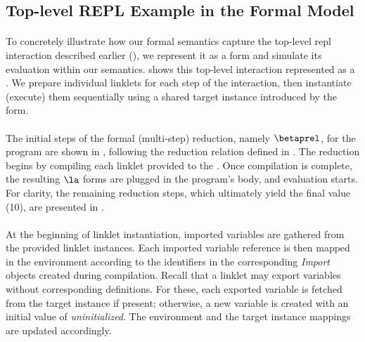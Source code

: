 		\subsection{Top-level REPL Example in the Formal Model}
		\label{subsec:toplevel-example-formal}


		\paragraph{}%
			To concretely illustrate how our formal semantics capture the top-level \gls{repl} interaction described earlier (), we represent it as a  form and simulate its evaluation within our semantics.  shows this top-level interaction represented as a . We prepare individual linklets for each step of the interaction, then instantiate (execute) them sequentially using a shared target instance introduced by the  form.

		\paragraph{}%
			The initial steps of the formal (multi-step) reduction, namely $\betaprel$, for the program are shown in , following the reduction relation defined in . The reduction begins by compiling each linklet provided to the . Once compilation is complete, the resulting $\la$ forms are plugged in the program's body, and evaluation starts. For clarity, the remaining reduction steps, which ultimately yield the final value (10), are presented in .


		\paragraph{}%
			At the beginning of linklet instantiation, imported variables are gathered from the provided linklet instances. Each imported variable reference is then mapped in the environment according to the identifiers in the corresponding \emph{Import} objects created during compilation. Recall that a linklet may export variables without corresponding definitions. For these, each exported variable is fetched from the target instance if present; otherwise, a new variable is created with an initial value of \emph{uninitialized}. The environment and the target instance mappings are updated accordingly.

